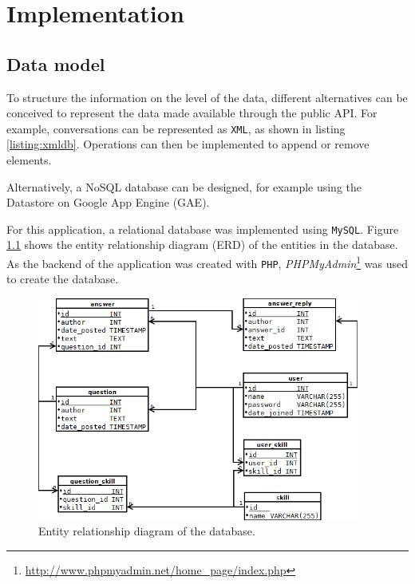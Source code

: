 \chapter{Implementation}\label{chapter:implementation}

\section{Data model}\label{section:datamodel}

To structure the information on the level of the data, different alternatives can be conceived to represent the data made available through the public API. For example, conversations can be represented as \texttt{XML}, as shown in listing \ref{listing:xmldb}. Operations can then be implemented to append or remove elements.



Alternatively, a NoSQL database can be designed, for example using the Datastore on Google App Engine (GAE).

For this application, a relational database was implemented using \texttt{MySQL}. Figure \ref{figure:erd} shows the entity relationship diagram (ERD) of the entities in the database. As the backend of the application was created with \texttt{PHP}, \emph{PHPMyAdmin}\footnote{\url{http://www.phpmyadmin.net/home_page/index.php}} was used to create the database.

\begin{figure}
	\includegraphics[width=400px]{img/erd}
	\caption{Entity relationship diagram of the database.}
	\label{figure:erd}
\end{figure}



